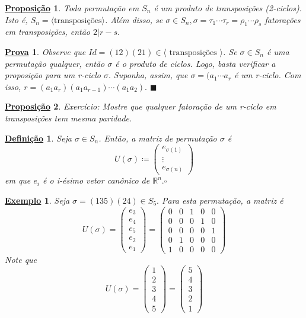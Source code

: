 \documentclass{article}
\newtheorem*{def*}{\underline{Defini\c c\~ao}}
\newtheorem*{prop*}{\underline{Proposi\c c\~ao}}
\newtheorem{example*}{\underline{Exemplo}}
\newtheorem*{proof*}{\underline{Prova}}
\renewcommand\qedsymbol{$\blacksquare$}
\begin{document}
\begin{prop*}
  Toda permuta\c c\~ao em $S_{n}$ \'e um produto de transposi\c c\~oes (2-ciclos). Isto \'e, $S_{n}=\langle\text{transposi\c c\~oes}\rangle$. 
Al\'em disso, se $\sigma\in S_{n}, \sigma=\tau_{1}\cdots\tau_{r} = \rho_{1}\cdots\rho_{s}$ fatora\c c\~oes em transposi\c c\~oes, ent\~ao $2|r-s.$
\end{prop*}
\begin{proof*}
  Observe que $Id = (12)(21)\in\langle\text{ transposi\c c\~oes }\rangle$. Se $\sigma\in S_{n}$ \'e uma permuta\c c\~ao qualquer, ent\~ao $\sigma$ \'e 
o produto de ciclos. Logo, basta verificar a proposi\c c\~ao para um r-ciclo $\sigma.$ Suponha, assim, que $\sigma = (a_{1}\cdots a_{r}$ \'e um r-ciclo.
Com isso, $r=(a_{1}a_{r})(a_{1}a_{r-1})\cdots(a_{1}a_{2}).$ \qedsymbol
\end{proof*}
\begin{prop*}
  Exerc\'icio: Mostre que qualquer fatora\c c\~ao de um r-ciclo em transposi\c c\~oes tem mesma paridade.
\end{prop*}
\begin{def*}
  Seja $\sigma\in S_{n}$. Ent\~ao, a matriz de permuta\c c\~ao $\sigma$ \'e
  $$
    U(\sigma)\coloneqq \begin{pmatrix}
      e_{\sigma(1)}\\
      \vdots\\
      e_{\sigma(n)}
    \end{pmatrix}
  $$
  em que $e_{i}$ \'e o i-\'esimo vetor can\^onico de $\mathbb{R}^{n}.\square$
\end{def*}
\begin{example*}
  Seja $\sigma = (135)(24)\in S_{5}.$ Para esta permuta\c c\~ao, a matriz \'e
  $$
    U(\sigma) =
    \begin{pmatrix}
      e_{3}\\
      e_{4}\\
      e_{5}\\
      e_{2}\\
      e_{1}
    \end{pmatrix} =
    \begin{pmatrix}
      0 & 0 & 1 & 0 & 0\\
      0 & 0 & 0 & 1 & 0\\
      0 & 0 & 0 & 0 & 1\\
      0 & 1 & 0 & 0 & 0\\
      1 & 0 & 0 & 0 & 0
    \end{pmatrix}
  $$
  Note que 
  $$
    U(\sigma) = \begin{pmatrix}
      1\\
      2\\
      3\\
      4\\
      5
    \end{pmatrix} =
    \begin{pmatrix}
      5\\
      4\\
      3\\
      2\\
      1
    \end{pmatrix}
  $$
\end{example*}
\end{document}
